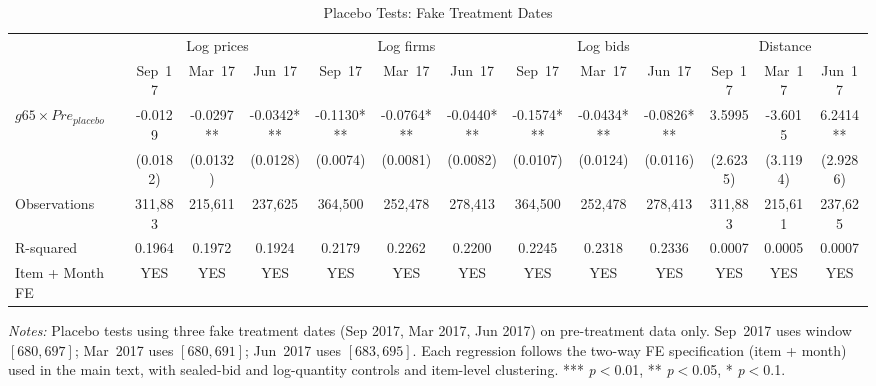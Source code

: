\begin{table}[htbp]
\centering
\caption{Placebo Tests: Fake Treatment Dates}
\label{tab:placebo}
\begin{adjustbox}{max width=\textwidth}
\begin{threeparttable}
\small
\begin{tabular}{lcccccccccccc}
\toprule
 & \multicolumn{3}{c}{Log prices} & \multicolumn{3}{c}{Log firms} & \multicolumn{3}{c}{Log bids} & \multicolumn{3}{c}{Distance} \\
\cmidrule(lr){2-4} \cmidrule(lr){5-7} \cmidrule(lr){8-10} \cmidrule(lr){11-13}
 & Sep~17 & Mar~17 & Jun~17 & Sep~17 & Mar~17 & Jun~17 & Sep~17 & Mar~17 & Jun~17 & Sep~17 & Mar~17 & Jun~17 \\
\midrule
$g65 \times Pre_{placebo}$ & -0.0129 & -0.0297** & -0.0342*** & -0.1130*** & -0.0764*** & -0.0440*** & -0.1574*** & -0.0434*** & -0.0826*** & 3.5995 & -3.6015 & 6.2414** \\
 & (0.0182) & (0.0132) & (0.0128) & (0.0074) & (0.0081) & (0.0082) & (0.0107) & (0.0124) & (0.0116) & (2.6235) & (3.1194) & (2.9286) \\
\midrule
Observations & 311,883 & 215,611 & 237,625 & 364,500 & 252,478 & 278,413 & 364,500 & 252,478 & 278,413 & 311,883 & 215,611 & 237,625 \\
R-squared & 0.1964 & 0.1972 & 0.1924 & 0.2179 & 0.2262 & 0.2200 & 0.2245 & 0.2318 & 0.2336 & 0.0007 & 0.0005 & 0.0007 \\
Item + Month FE & YES & YES & YES & YES & YES & YES & YES & YES & YES & YES & YES & YES \\
\bottomrule
\end{tabular}
\begin{tablenotes}
\small
\item \textit{Notes:} Placebo tests using three fake treatment dates
(Sep 2017, Mar 2017, Jun 2017) on pre-treatment data only. Sep~2017
uses window $[680, 697]$; Mar~2017 uses $[680, 691]$; Jun~2017 uses
$[683, 695]$. Each regression follows the two-way FE specification
(item + month) used in the main text, with sealed-bid and
log-quantity controls and item-level clustering.
*** \textit{p}$<$0.01, ** \textit{p}$<$0.05, * \textit{p}$<$0.1.
\end{tablenotes}
\end{threeparttable}
\end{adjustbox}
\end{table}
